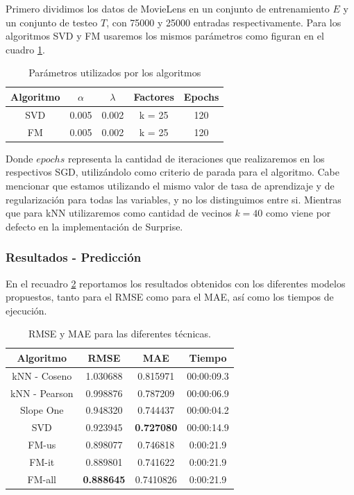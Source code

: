 \documentclass[hidelinks,12pt,a4paper]{book}
\theoremstyle{plain}
\theoremstyle{definition}
\begin{document}
Primero dividimos los datos de MovieLens en un conjunto de entrenamiento $E$ y un conjunto de testeo $T$, con 75000 y 25000 entradas respectivamente. Para los algoritmos SVD y FM usaremos los mismos parámetros como figuran en el cuadro \ref{tb:params1}.

\begin{table}[ht]
\centering
\begin{tabular}{|c|c c c c|}
\hline
Algoritmo & $\alpha$ & $\lambda$ & Factores & Epochs\\
\hline
SVD & 0.005 & 0.002 & k = 25 & 120 \\
FM & 0.005 & 0.002 & k = 25 & 120 \\
\hline
\end{tabular}
\caption{Parámetros utilizados por los algoritmos}
\label{tb:params1}
\end{table}

Donde $epochs$ representa la cantidad de iteraciones que realizaremos en los respectivos SGD, utilizándolo como criterio de parada para el algoritmo. Cabe mencionar que estamos utilizando el mismo valor de tasa de aprendizaje y de regularización para todas las variables, y no los distinguimos entre si. Mientras que para kNN utilizaremos como cantidad de vecinos $k=40$ como viene por defecto en la implementación de Surprise.

\subsubsection{Resultados - Predicción}

En el recuadro \ref{tb:resul1} reportamos los resultados obtenidos con los diferentes modelos propuestos, tanto para el RMSE como para el MAE, así como los tiempos de ejecución.

\begin{table}[h]
\centering
\begin{tabular}{|c|c c c|}
\hline
Algoritmo & RMSE & MAE & Tiempo \\
\hline
kNN - Coseno & 1.030688 & 0.815971 & 00:00:09.3\\
kNN - Pearson & 0.998876 & 0.787209 & 00:00:06.9 \\
Slope One & 0.948320 & 0.744437 & 00:00:04.2 \\
SVD & 0.923945 & \textbf{0.727080} & 00:00:14.9\\
FM-us & 0.898077 & 0.746818 & 0:00:21.9 \\
FM-it & 0.889801 & 0.741622 & 0:00:21.9\\
FM-all & \textbf{0.888645} & 0.7410826 & 0:00:21.9 \\
\hline
\end{tabular}
\caption{RMSE y MAE para las diferentes técnicas.}
\label{tb:resul1}
\end{table}
\end{document}
